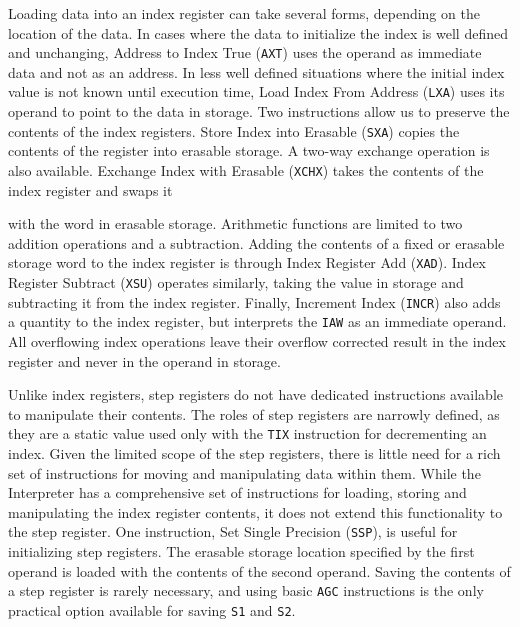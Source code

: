 \documentclass[refcap, oxford]{ahsan}
\begin{document}
Loading data into an index register can take several forms, depending on the location of the data. In cases where the data to initialize the index is well defined and unchanging, Address to Index True (\texttt{AXT}) uses the operand as immediate data and not as an address. In less well defined situations where the initial index value is not known until execution time, Load Index From Address (\texttt{LXA}) uses its operand to point to the data in storage. Two instructions allow us to preserve the contents of the index registers. Store Index into Erasable (\texttt{SXA}) copies the contents of the register into erasable storage. A two-way exchange operation is also available. Exchange Index with Erasable (\texttt{XCHX}) takes the contents of the index register and swaps it


with the word in erasable storage. Arithmetic functions are limited to two addition operations and a subtraction. Adding the contents of a fixed or erasable storage word to the index register is through Index Register Add (\texttt{XAD}). Index Register Subtract (\texttt{XSU}) operates similarly, taking the value in storage and subtracting it from the index register. Finally, Increment Index (\texttt{INCR}) also adds a quantity to the index register, but interprets the \texttt{IAW} as an immediate operand. All overflowing index operations leave their overflow corrected result in the index register and never in the operand in storage.

Unlike index registers, step registers do not have dedicated instructions available to manipulate their contents. The roles of step registers are narrowly defined, as they are a static value used only with the \texttt{TIX} instruction for decrementing an index. Given the limited scope of the step registers, there is little need for a rich set of instructions for moving and manipulating data within them. While the Interpreter has a comprehensive set of instructions for loading, storing and manipulating the index register contents, it does not extend this functionality to the step register. One instruction, Set Single Precision (\texttt{SSP}), is useful for initializing step registers. The erasable storage location specified by the first operand is loaded with the contents of the second operand. Saving the contents of a step register is rarely necessary, and using basic \texttt{AGC} instructions is the only practical option available for saving \texttt{S1} and \texttt{S2}.
\end{document}
